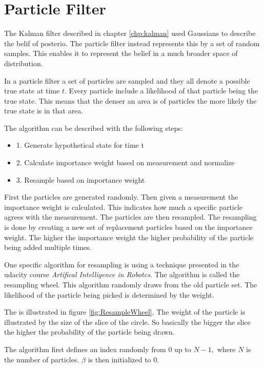 \chapter{Particle Filter}
\label{chp:partFilter}

The Kalman filter described in chapter \ref{chp:kalman} used Gaussians to describe the belif of posterio. The particle filter instead represents this by a set of random samples. This enables it to represent the belief in a much broader space of distribution.

In a particle filter a set of particles are sampled and they all denote a possible true state at time $t$. Every particle include a likelihood of that particle being the true state. This means that the denser an area is of particles the more likely the true state is in that area.

The algorithm can be described with the following steps:
\begin{itemize}
	\item 1. Generate hypothetical state for time t 
	\item 2. Calculate importance weight based on measurement and normalize
	\item 3. Resample based on importance weight
\end{itemize}

First the particles are generated randomly. Then given a measurement the importance weight is calculated. This indicates how much a specific particle agrees with the measurement. The particles are then resampled. The resampling is done by creating a new set of replacement particles based on the importance weight. The higher the importance weight the higher probability of the particle being added multiple times.

One specific algorithm for resampling is using a technique presented in the udacity course \emph{Artifical Intelligence in Robotcs}\citep{udacity}. The algorithm is called the resampling wheel. This algorithm randomly draws from the old particle set. The likelihood of the particle being picked is determined by the weight.



The is illustrated in figure \ref{fig:ResampleWheel}. The weight of the particle is illustrated by the size of the slice of the circle. So basically the bigger the slice the higher the probability of the particle being drawn.

\FloatBarrier
The algorithm first defines an index randomly from 0 up to $N-1,$ where $N$ is the number of particles. $\beta$ is then initialized to 0. 

